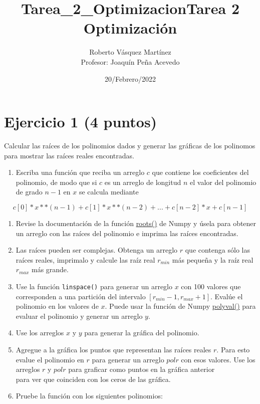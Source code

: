 \documentclass[11pt]{article}
\title{Tarea\_2\_Optimizacion}
\providecommand{\tightlist}{%
      \setlength{\itemsep}{0pt}\setlength{\parskip}{0pt}}
\begin{document}
    \title{Tarea 2 Optimización}
    \author{Roberto Vásquez Martínez \\ Profesor: Joaquín Peña Acevedo}
    \date{20/Febrero/2022}
    \maketitle    
    

    
    \hypertarget{ejercicio-1-4-puntos}{%
\section{Ejercicio 1 (4 puntos)}\label{ejercicio-1-4-puntos}}

Calcular las raíces de los polinomios dados y generar las gráficas de
los polinomos para mostrar las raíces reales encontradas.

\begin{enumerate}
\def\labelenumi{\arabic{enumi}.}
\tightlist
\item
  Escriba una función que reciba un arreglo \(c\) que contiene los
  coeficientes del polinomio, de modo que si \(c\) es un arreglo de
  longitud \(n\) el valor del polinomio de grado \(n-1\) en \(x\) se
  calcula mediante
\end{enumerate}

\[ c[0]*x**(n-1) + c[1]*x**(n-2) + ... + c[n-2]*x + c[n-1]\]

\begin{enumerate}
\def\labelenumi{\arabic{enumi}.}
\setcounter{enumi}{1}
\item
  Revise la documentación de la función
  \href{https://numpy.org/doc/stable/reference/generated/numpy.roots.html}{roots()}
  de Numpy y úsela para obtener un arreglo con las raíces del polinomio
  e imprima las raíces encontradas.
\item
  Las raíces pueden ser complejas. Obtenga un arreglo \(r\) que contenga
  sólo las raíces reales, imprimalo y calcule las raíz real \(r_{min}\)
  más pequeña y la raíz real \(r_{max}\) más grande.
\item
  Use la función \texttt{linspace()} para generar un arreglo \(x\) con
  100 valores que corresponden a una partición del intervalo
  \([r_{min}-1, r_{max}+1]\). Evalúe el polinomio en los valores de
  \(x\). Puede usar la función de Numpy
  \href{https://numpy.org/doc/stable/reference/generated/numpy.polyval.html\#numpy.polyval}{polyval()}
  para evaluar el polinomio y generar un arreglo \(y\).
\item
  Use los arreglos \(x\) y \(y\) para generar la gráfica del polinomio.
\item
  Agregue a la gráfica los puntos que representan las raíces reales
  \(r\). Para esto evalue el polinomio en \(r\) para generar un arreglo
  \(polr\) con esos valores. Use los arreglos \(r\) y \(polr\) para
  graficar como puntos en la gráfica anterior\\
  para ver que coinciden con los ceros de las gráfica.
\item
  Pruebe la función con los siguientes polinomios:
\end{enumerate}
\end{document}
